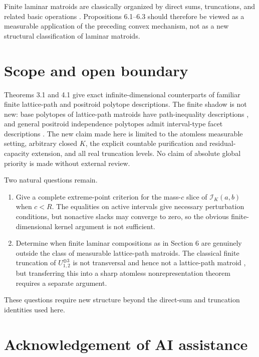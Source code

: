 \documentclass[11pt]{article}
\numberwithin{equation}{section}
\begin{document}
Finite laminar matroids are classically organized by direct sums, truncations, and
related basic operations \cite{fifeoxley2017}. Propositions 6.1--6.3 should therefore be viewed as a
measurable application of the preceding convex mechanism, not as a new structural
classification of laminar matroids.

\section{Scope and open boundary}


Theorems 3.1 and 4.1 give exact infinite-dimensional counterparts of familiar finite
lattice-path and positroid polytope descriptions. The finite shadow is not new: base
polytopes of lattice-path matroids have path-inequality descriptions \cite{bidkhori2012}, and general
positroid independence polytopes admit interval-type facet descriptions \cite{ohxiang2022}. The new
claim made here is limited to the atomless measurable setting, arbitrary closed $K$,
the explicit countable purification and residual-capacity extension, and all real
truncation levels. No claim of absolute global priority is made without external review.

Two natural questions remain.

\begin{enumerate}
\item Give a complete extreme-point criterion for the mass-$c$ slice of
$\mathcal I_K(a,b)$ when $c<R$. The equalities on active intervals give necessary
perturbation conditions, but nonactive slacks may converge to zero, so the obvious
finite-dimensional kernel argument is not sufficient.
\item Determine when finite laminar compositions as in Section 6 are genuinely outside
the class of measurable lattice-path matroids. The classical finite truncation of
$U_{1,2}^{\oplus3}$ is not transversal and hence not a lattice-path matroid \cite{bonindemier2006}, but
transferring this into a sharp atomless nonrepresentation theorem requires a
separate argument.

\end{enumerate}

These questions require new structure beyond the direct-sum and truncation identities
used here.

\section*{Acknowledgement of AI assistance}
\end{document}
